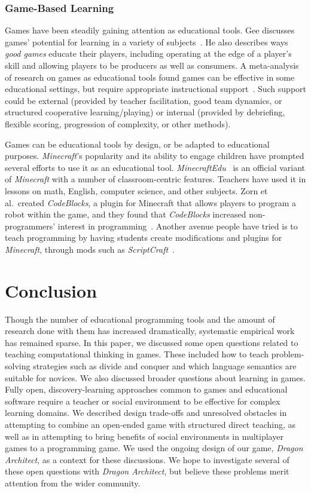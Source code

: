 \documentclass{sig-alternate}
\newcommand{\TODO}[1]{{\color{red} TODO: #1}}
\newcommand{\gametitle}{{\emph{Dragon Architect}}}
\begin{document}
\subsubsection{Game-Based Learning}
Games have been steadily gaining attention as educational tools. 
Gee discusses games' potential for learning in a variety of subjects~\cite{gee2003video}.
He also describes ways \emph{good games} educate their players, including operating at the edge of a player's skill and allowing players to be producers as well as consumers.
A meta-analysis of research on games as educational tools found games can be effective in some educational settings, but require appropriate instructional support~\cite{ke2009qualitative}.
Such support could be external (provided by teacher facilitation, good team dynamics, or structured cooperative learning/playing) or internal (provided by debriefing, flexible scoring, progression of complexity, or other methods).

Games can be educational tools by design, or be adapted to educational purposes. 
\emph{Minecraft}'s popularity and its ability to engage children have prompted several efforts to use it as an educational tool.
\emph{MinecraftEdu}~\cite{minecraftedu} is an official variant of \emph{Minecraft} with a number of classroom-centric features. 
Teachers have used it in lessons on math, English, computer science, and other subjects.  
Zorn et al.\ created \emph{CodeBlocks}, a plugin for Minecraft that allows players to program a robot within the game, and they found that \emph{CodeBlocks} increased non-programmers' interest in programming~\cite{zorn2013minecraft}.
Another avenue people have tried is to teach programming by having students create modifications and plugins for \emph{Minecraft}, through mods such as \emph{ScriptCraft}~\cite{scriptcraft}.

\section{Conclusion}


Though the number of educational programming tools and the amount of research done with them has increased dramatically, systematic empirical work has remained sparse.
In this paper, we discussed some open questions related to teaching computational thinking in games.
These included how to teach problem-solving strategies such as divide and conquer and which language semantics are suitable for novices.
We also discussed broader questions about learning in games.
Fully open, discovery-learning approaches common to games and educational software require a teacher or social environment to be effective for complex learning domains.
We described design trade-offs and unresolved obstacles in attempting to combine an open-ended game with structured direct teaching, as well as in attempting to bring benefits of social environments in multiplayer games to a programming game.
We used the ongoing design of our game, \gametitle{}, as a context for these discussions.
We hope to investigate several of these open questions with \gametitle{}, but believe these problems merit attention from the wider community.



 
\end{document}
